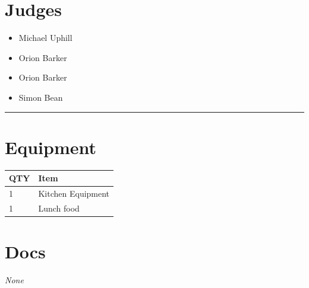 \documentclass[10pt]{article}
\begin{document}
		\section*{\faUsers \: Judges}

		

	\begin{multicols}{2}

		\begin{itemize}
									\item Michael Uphill
									\item Orion Barker
						\end{itemize}

		\vfill\null
		\columnbreak

		\begin{itemize}
									\item Orion Barker
									\item Simon Bean
						\end{itemize}

		\vfill\null

		\end{multicols}



			\vspace{0.5cm}
	\hrule
	\vspace{0.5cm}

	\begin{multicols}{2}

		\section*{\faWrench \: Equipment}

		
	\begin{center}
			\begin{tabular}{p{2cm}p{4cm}}


				\textbf{QTY} & \textbf{Item} \\\toprule
												1&Kitchen Equipment\\\midrule
												1&Lunch food\\\midrule
								\end{tabular}

			\end{center}

		
		\vfill\null
		\columnbreak

			\section*{\faFile \: Docs}
		 	\textit{None}
	

		\vfill\null

		\end{multicols}
\end{document}
